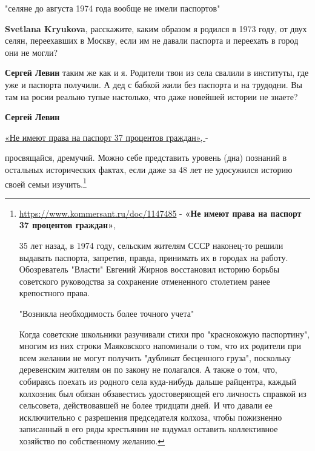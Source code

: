 \begin{itemize}
"селяне до августа 1974 года вообще не имели паспортов"

\textbf{Svetlana Kryukova}, расскажите, каким образом я родился в 1973 году, от двух
селян, переехавших в Москву, если им не давали паспорта и переехать в город они
не могли?

\begin{itemize}
 
\textbf{Сергей Левин} таким же как и я. Родители твои из села свалили в институты, где уже и паспорта получили. А дед с бабкой жили без паспорта и на трудодни. Вы там на росии реально тупые настолько, что даже новейшей истории не знаете?

 
\textbf{Сергей Левин} 

\href{https://www.kommersant.ru/doc/1147485}{
«Не имеют права на паспорт 37 процентов граждан», 
} - 

просвящайся, дремучий. Можно себе представить уровень (дна) познаний в
остальных исторических фактах, если даже за 48 лет не удосужился историю своей
семьи изучить.\footnote{
\url{https://www.kommersant.ru/doc/1147485} - {\bfseries «Не имеют права на паспорт 37 процентов граждан»}, 

35 лет назад, в 1974 году, сельским жителям СССР наконец-то решили выдавать
паспорта, запретив, правда, принимать их в городах на работу. Обозреватель
"Власти" Евгений Жирнов восстановил историю борьбы советского руководства за
сохранение отмененного столетием ранее крепостного права.

"Возникла необходимость более точного учета"

Когда советские школьники разучивали стихи про "краснокожую паспортину", многим
из них строки Маяковского напоминали о том, что их родители при всем желании не
могут получить "дубликат бесценного груза", поскольку деревенским жителям он по
закону не полагался. А также о том, что, собираясь поехать из родного села
куда-нибудь дальше райцентра, каждый колхозник был обязан обзавестись
удостоверяющей его личность справкой из сельсовета, действовавшей не более
тридцати дней. И что давали ее исключительно с разрешения председателя колхоза,
чтобы пожизненно записанный в его ряды крестьянин не вздумал оставить
коллективное хозяйство по собственному желанию.

}
\end{itemize}
\end{itemize}
